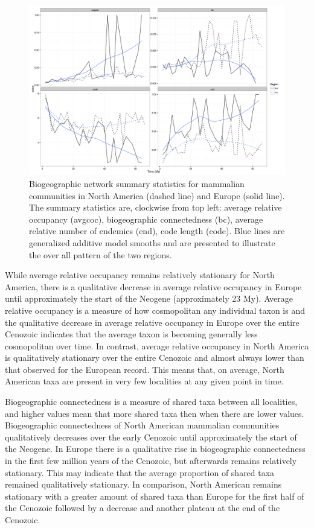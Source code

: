\documentclass[12pt,letterpaper]{article}
\begin{document}
\begin{figure}[ht]
  \begin{center}
    \includegraphics[height = 0.4\textheight, keepaspectratio = true]{figure/gen_bin}
  \end{center}
  \caption{Biogeographic network summary statistics for mammalian communities in North America (dashed line) and Europe (solid line). The summary statistics are, clockwise from top left: average relative occupancy (avgcoc), biogeographic connectedness (bc), average relative number of endemics (end), code length (code). Blue lines are generalized additive model smooths and are presented to illustrate the over all pattern of the two regions.} 
  \label{fig:mam_tot}
\end{figure}

While average relative occupancy remains relatively stationary for North America, there is a qualitative decrease in average relative occupancy in Europe until approximately the start of the Neogene (approximately 23 My). Average relative occupancy is a measure of how cosmopolitan any individual taxon is and the qualitative decrease in average relative occupancy in Europe over the entire Cenozoic indicates that the average taxon is becoming generally less cosmopolitan over time. In contrast, average relative occupancy in North America is qualitatively stationary over the entire Cenozoic and almost always lower than that observed for the European record. This means that, on average, North American taxa are present in very few localities at any given point in time.

Biogeographic connectedness is a measure of shared taxa between all localities, and higher values mean that more shared taxa then when there are lower values. Biogeographic connectedness of North American mammalian communities qualitatively decreases over the early Cenozoic until approximately the start of the Neogene. In Europe there is a qualitative rise in biogeographic connectedness in the first few million years of the Cenozoic, but afterwards remains relatively stationary. This may indicate that the average proportion of shared taxa remained qualitatively stationary. In comparison, North American remains stationary with a greater amount of shared taxa than Europe for the first half of the Cenozoic followed by a decrease and another plateau at the end of the Cenozoic.
\end{document}
